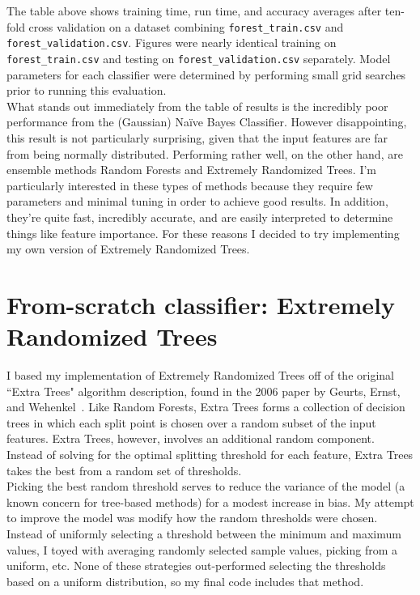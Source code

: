 \documentclass[letter,12pt]{report}
\begin{document}
The table above shows training time, run time, and accuracy averages after ten-fold cross validation on a dataset combining \verb!forest_train.csv! and \verb!forest_validation.csv!.  Figures were nearly identical training on \verb!forest_train.csv! and testing on \verb!forest_validation.csv! separately.  Model parameters for each classifier were determined by performing small grid searches prior to running this evaluation.  \\

What stands out immediately from the table of results is the incredibly poor performance from the (Gaussian) Na{\"i}ve Bayes Classifier.  However disappointing, this result is not particularly surprising, given that the input features are far from being normally distributed.  Performing rather well, on the other hand, are ensemble methods Random Forests and Extremely Randomized Trees.  I'm particularly interested in these types of methods because they require few parameters and minimal tuning in order to achieve good results.  In addition, they're quite fast, incredibly accurate, and are easily interpreted to determine things like feature importance.  For these reasons I decided to try implementing my own version of Extremely Randomized Trees.  

\section*{From-scratch classifier: Extremely Randomized Trees}

I based my implementation of Extremely Randomized Trees off of the original ``Extra Trees" algorithm description, found in the 2006 paper by Geurts, Ernst, and Wehenkel~\cite{extrees}.  Like Random Forests, Extra Trees forms a collection of decision trees in which each split point is chosen over a random subset of the input features.  Extra Trees, however, involves an additional random component.  Instead of solving for the optimal splitting threshold for each feature, Extra Trees takes the best from a random set of thresholds. \\

Picking the best random threshold serves to reduce the variance of the model (a known concern for tree-based methods) for a modest increase in bias.  My attempt to improve the model was modify how the random thresholds were chosen.  Instead of uniformly selecting a threshold between the minimum and maximum values, I toyed with averaging randomly selected sample values, picking from a uniform, etc.  None of these strategies out-performed selecting the thresholds based on a uniform distribution, so my final code includes that method.  \\
\end{document}
